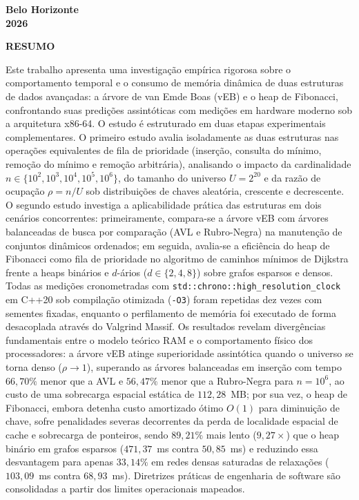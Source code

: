 \documentclass[12pt,a4paper]{report}
\begin{document}
\vfill
\begin{center}
  \textbf{Belo Horizonte}\\[0.2cm]
  \textbf{2026}
\end{center}

\newpage
\thispagestyle{empty}
\begin{center}
  \textbf{RESUMO}
\end{center}

\noindent
Este trabalho apresenta uma investigação empírica rigorosa sobre o comportamento temporal e o consumo de memória dinâmica de duas estruturas de dados avançadas: a árvore de van Emde Boas (vEB) e o heap de Fibonacci, confrontando suas predições assintóticas com medições em hardware moderno sob a arquitetura x86-64. O estudo é estruturado em duas etapas experimentais complementares. O primeiro estudo avalia isoladamente as duas estruturas nas operações equivalentes de fila de prioridade (inserção, consulta do mínimo, remoção do mínimo e remoção arbitrária), analisando o impacto da cardinalidade $n \in \{10^2, 10^3, 10^4, 10^5, 10^6\}$, do tamanho do universo $U=2^{20}$ e da razão de ocupação $\rho = n/U$ sob distribuições de chaves aleatória, crescente e decrescente. O segundo estudo investiga a aplicabilidade prática das estruturas em dois cenários concorrentes: primeiramente, compara-se a árvore vEB com árvores balanceadas de busca por comparação (AVL e Rubro-Negra) na manutenção de conjuntos dinâmicos ordenados; em seguida, avalia-se a eficiência do heap de Fibonacci como fila de prioridade no algoritmo de caminhos mínimos de Dijkstra frente a heaps binários e $d$-ários ($d \in \{2, 4, 8\}$) sobre grafos esparsos e densos. Todas as medições cronometradas com \texttt{std::chrono::high\_resolution\_clock} em C++20 sob compilação otimizada (\texttt{-O3}) foram repetidas dez vezes com sementes fixadas, enquanto o perfilamento de memória foi executado de forma desacoplada através do Valgrind Massif. Os resultados revelam divergências fundamentais entre o modelo teórico RAM e o comportamento físico dos processadores: a árvore vEB atinge superioridade assintótica quando o universo se torna denso ($\rho \to 1$), superando as árvores balanceadas em inserção com tempo $66{,}70\%$ menor que a AVL e $56{,}47\%$ menor que a Rubro-Negra para $n=10^6$, ao custo de uma sobrecarga espacial estática de $112{,}28$~MB; por sua vez, o heap de Fibonacci, embora detenha custo amortizado ótimo $O(1)$ para diminuição de chave, sofre penalidades severas decorrentes da perda de localidade espacial de cache e sobrecarga de ponteiros, sendo $89{,}21\%$ mais lento ($9{,}27\times$) que o heap binário em grafos esparsos ($471{,}37$~ms contra $50{,}85$~ms) e reduzindo essa desvantagem para apenas $33{,}14\%$ em redes densas saturadas de relaxações ($103{,}09$~ms contra $68{,}93$~ms). Diretrizes práticas de engenharia de software são consolidadas a partir dos limites operacionais mapeados.\\[0.5cm]
\end{document}
